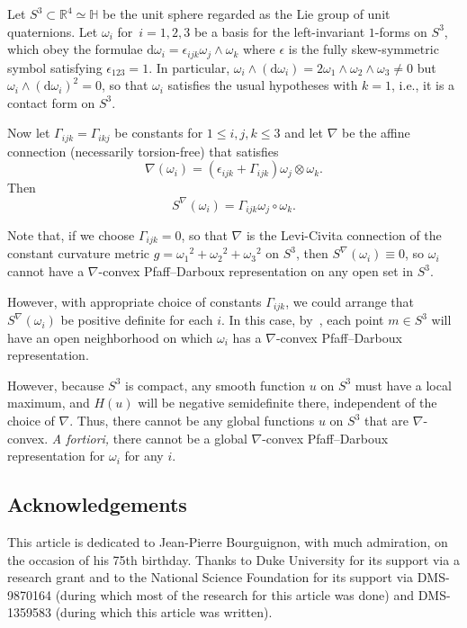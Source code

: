 \documentclass[10pt,a4paper]{amsart}
\renewcommand{\d}{\mathrm{d}}%
\newcommand{\w}{\wedge}
\numberwithin{equation}{section}
\begin{document}
\begin{Example}%
Let $S^3\subset\mathbb{R}^4\simeq\mathbb{H}$
be the unit sphere regarded as the Lie group of unit quaternions.
Let $\omega_i$ for~$i=1,2,3$ be a basis for the left-invariant $1$-forms
on $S^3$, which obey the formulae $\d\omega_i = \epsilon_{ijk} \omega_j\w\omega_k$ where $\epsilon$ is the fully skew-symmetric symbol
satisfying $\epsilon_{123}=1$. In particular, $\omega_i\w(\d\omega_i)
= 2 \omega_1\w\omega_2\w\omega_3\not=0$ but $\omega_i\w(\d\omega_i)^2 = 0$,
so that $\omega_i$ satisfies the usual hypotheses with $k=1$, i.e.,
it is a contact form on $S^3$.

Now let $\Gamma_{ijk}=\Gamma_{ikj}$ be constants for $1\le i,j,k\le 3$
and let $\nabla$ be the affine connection (necessarily torsion-free) that satisfies
\[
\nabla(\omega_i) = (\epsilon_{ijk}+\Gamma_{ijk}) \omega_j\otimes\omega_k .
\]
Then
\[
S^\nabla(\omega_i) = \Gamma_{ijk} \omega_j\circ\omega_k.
\]

Note that, if we choose $\Gamma_{ijk}=0$, so that $\nabla$
is the Levi-Civita connection of the constant curvature metric
$g = {\omega_1}^2+{\omega_2}^2+{\omega_3}^2$ on $S^3$,
then $S^\nabla(\omega_i)\equiv0$, so $\omega_i$ cannot
have a $\nabla$-convex Pfaff--Darboux representation
on any open set in $S^3$.

However, with appropriate choice of constants $\Gamma_{ijk}$,
we could arrange that
$S^\nabla(\omega_i)$ be positive definite for each $i$. In this case,
by~\cite[Theorem~1]{MR2023129}, each point $m\in S^3$ will have an open neighborhood
on which $\omega_i$ has a $\nabla$-convex Pfaff--Darboux representation.

However, because $S^3$ is compact, any smooth function $u$ on $S^3$
must have a local maximum, and $H(u)$ will be negative semidefinite
there, independent of the choice of $\nabla$. Thus, there cannot be
any global functions $u$ on $S^3$ that are $\nabla$-convex.
\emph{A fortiori,}
there cannot be a global $\nabla$-convex Pfaff--Darboux representation
for $\omega_i$ for any $i$.
\end{Example}

\subsection*{Acknowledgements}

This article is dedicated to Jean-Pierre Bourguignon,
with much admiration, on the occasion of his 75th birthday.
Thanks to Duke University for its support
via a research grant and to the National Science Foundation
for its support via DMS-9870164
(during which most of the research for this article was done)
and DMS-1359583 (during which this article was written).
\end{document}
